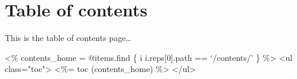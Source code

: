 \documentclass{article}
\begin{document}
\section{Table of contents}\hypertarget{table-of-contents}{}\label{table-of-contents}

This is the table of contents page\ldots{}

\textless{}\% contents\_home = @items.find \{ \textbar{}i\textbar{} i.reps[0].path == `/contents/' \} \%\textgreater{}
\textless{}ul class="toc"\textgreater{}
\textless{}\%= toc (contents\_home) \%\textgreater{}
\textless{}/ul\textgreater{}
\end{document}
